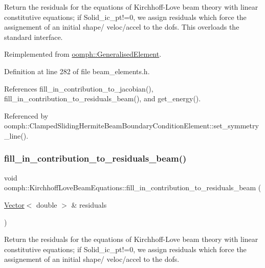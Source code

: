 Return the residuals for the equations of Kirchhoff-\/\+Love beam theory with linear constitutive equations; if Solid\+\_\+ic\+\_\+pt!=0, we assign residuals which force the assignement of an initial shape/ veloc/accel to the dofs. This overloads the standard interface. 



Reimplemented from \hyperlink{classoomph_1_1GeneralisedElement_a310c97f515e8504a48179c0e72c550d7}{oomph\+::\+Generalised\+Element}.



Definition at line 282 of file beam\+\_\+elements.\+h.



References fill\+\_\+in\+\_\+contribution\+\_\+to\+\_\+jacobian(), fill\+\_\+in\+\_\+contribution\+\_\+to\+\_\+residuals\+\_\+beam(), and get\+\_\+energy().



Referenced by oomph\+::\+Clamped\+Sliding\+Hermite\+Beam\+Boundary\+Condition\+Element\+::set\+\_\+symmetry\+\_\+line().

\mbox{\label{classoomph_1_1KirchhoffLoveBeamEquations_a50800b61dd7036d13a9213388b7957c9}} 
\subsubsection{\texorpdfstring{fill\+\_\+in\+\_\+contribution\+\_\+to\+\_\+residuals\+\_\+beam()}{fill\_in\_contribution\_to\_residuals\_beam()}}
{\footnotesize\ttfamily void oomph\+::\+Kirchhoff\+Love\+Beam\+Equations\+::fill\+\_\+in\+\_\+contribution\+\_\+to\+\_\+residuals\+\_\+beam (\begin{DoxyParamCaption}\item[{\hyperlink{classoomph_1_1Vector}{Vector}$<$ double $>$ \&}]{residuals }\end{DoxyParamCaption})}



Return the residuals for the equations of Kirchhoff-\/\+Love beam theory with linear constitutive equations; if Solid\+\_\+ic\+\_\+pt!=0, we assign residuals which force the assignement of an initial shape/ veloc/accel to the dofs. 

